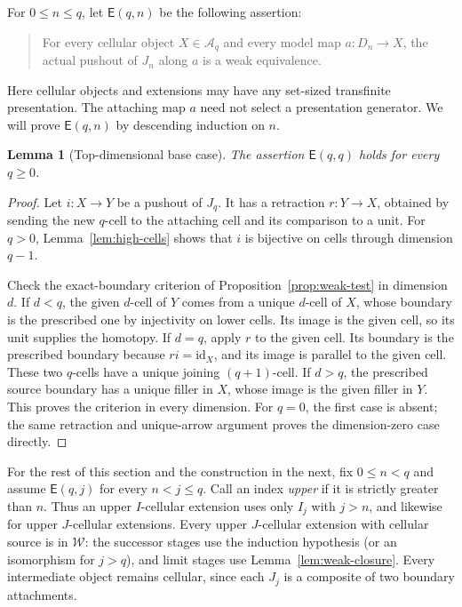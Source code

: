 \documentclass[11pt,letterpaper]{article}
\numberwithin{equation}{section}
\theoremstyle{plain}
\newtheorem{lemma}[theorem]{Lemma}
\theoremstyle{definition}
\theoremstyle{remark}
\newcommand{\id}{\mathrm{id}}
\begin{document}
For $0\leq n\leq q$, let $\mathsf E(q,n)$ be the following assertion:
\begin{quote}
For every cellular object $X\in\mathcal A_q$ and every model map
$a:D_n\to X$, the actual pushout of $J_n$ along $a$ is a weak
equivalence.
\end{quote}
Here cellular objects and extensions may have any set-sized
transfinite presentation.  The attaching map $a$ need not select
a presentation generator.  We will prove $\mathsf E(q,n)$ by
descending induction on $n$.

\begin{lemma}[Top-dimensional base case]\label{lem:cutoff-base}
The assertion $\mathsf E(q,q)$ holds for every $q\geq0$.
\end{lemma}

\begin{proof}
Let $i:X\to Y$ be a pushout of $J_q$.  It has a retraction
$r:Y\to X$, obtained by sending the new $q$-cell to the attaching
cell and its comparison to a unit.  For $q>0$,
Lemma~\ref{lem:high-cells} shows that $i$ is bijective on cells
through dimension $q-1$.

Check the exact-boundary criterion of
Proposition~\ref{prop:weak-test} in dimension $d$.  If $d<q$, the
given $d$-cell of $Y$ comes from a unique $d$-cell of $X$, whose
boundary is the prescribed one by injectivity on lower cells.
Its image is the given cell, so its unit supplies the homotopy.
If $d=q$, apply $r$ to the given cell.  Its boundary is the
prescribed boundary because $ri=\id_X$, and its image is parallel
to the given cell.  These two $q$-cells have a unique joining
$(q+1)$-cell.  If $d>q$, the prescribed source boundary has a
unique filler in $X$, whose image is the given filler in $Y$.
This proves the criterion in every dimension.
For $q=0$, the first case is absent; the same retraction and
unique-arrow argument proves the dimension-zero case directly.
\end{proof}

For the rest of this section and the construction in the next,
fix $0\leq n<q$ and assume $\mathsf E(q,j)$ for every
$n<j\leq q$.  Call an index \emph{upper} if it is strictly greater
than $n$.  Thus an upper $I$-cellular extension uses only $I_j$
with $j>n$, and likewise for upper $J$-cellular extensions.
Every upper $J$-cellular extension with cellular source is in
$\mathcal W$: the successor stages use the induction hypothesis
(or an isomorphism for $j>q$), and limit stages use
Lemma~\ref{lem:weak-closure}.  Every intermediate object remains
cellular, since each $J_j$ is a composite of two boundary
attachments.
\end{document}
